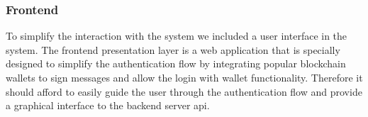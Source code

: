 \subsubsection{Frontend}
To simplify the interaction with the system we included a user interface in the system. The frontend presentation layer is a web application that is specially designed to simplify the authentication flow by integrating popular blockchain wallets to sign messages and allow the login with wallet functionality. Therefore it should afford to easily guide the user through the authentication flow and provide a graphical interface to the backend server \gls{api}.
